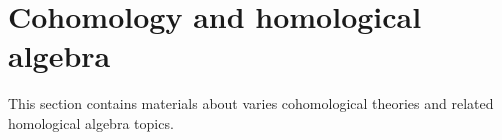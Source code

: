 \documentclass[../main.tex]{subfiles}
\begin{document}
\section{Cohomology and homological algebra}
This section contains materials about varies cohomological theories and related homological algebra topics.
\end{document}
